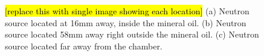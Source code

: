 \documentclass[%
12pt,
twoside,
reprint,
amsmath,amssymb,
aps,
]{article}
\begin{document}
	\begin{figure}[H]%
		\centering
		\qquad
		\qquad
		\caption{\label{tab:table-name} \hl{[replace this with single image showing each location]} (a) Neutron source located at 16mm away, inside the mineral oil. (b) Neutron source located 58mm away right outside the mineral oil. (c) Neutron source located far away from the chamber.}%
	\end{figure}
\end{document}
